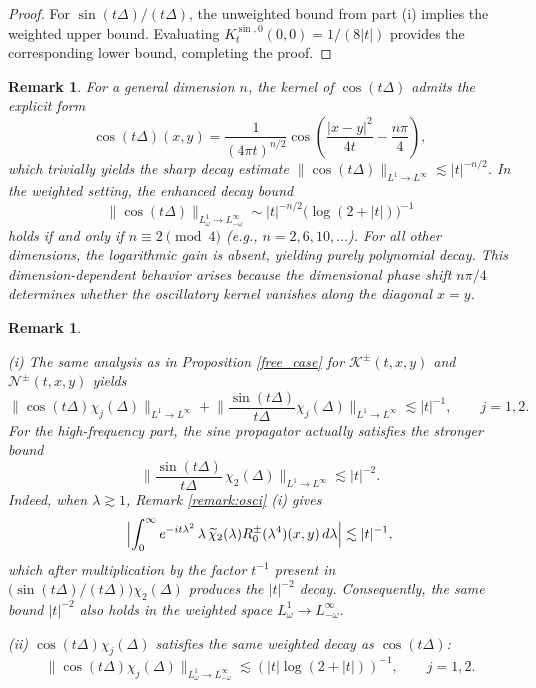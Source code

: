 \documentclass[reqno]{amsart}
\newtheorem{remark}[theorem]{Remark}
\numberwithin{equation}{section}
\begin{document}
\begin{proof}
	For $\sin(t\Delta)/(t\Delta)$, the unweighted  bound from part (i) implies the weighted upper bound. Evaluating $K_t^{\sin,0}(0, 0) = 1/(8|t|)$ provides the corresponding lower bound, completing the proof.
\end{proof}

\begin{remark}\label{free_cos_higher_dim}{\rm 
For a general dimension $n$, the kernel of $\cos(t\Delta)$ admits the explicit form
\[
\cos(t\Delta)(x,y) = \frac{1}{(4\pi t)^{n/2}} \cos\!\left(\frac{|x-y|^2}{4t} - \frac{n\pi}{4}\right),
\]
which trivially yields the sharp decay estimate $\|\cos(t\Delta)\|_{L^1\to L^\infty} \lesssim |t|^{-n/2}$. 
In the weighted setting, the enhanced decay bound
\[
\|\cos(t\Delta)\|_{L^1_\omega \to L^\infty_{-\omega}} \sim |t|^{-n/2} \bigl(\log(2+|t|)\bigr)^{-1}
\]
holds if and only if $n \equiv 2 \pmod{4}$ (e.g., $n = 2, 6, 10, \dots$). For all other dimensions, the logarithmic gain is absent, yielding purely polynomial decay. This dimension-dependent behavior arises because the dimensional phase shift $n\pi/4$ determines whether the oscillatory kernel  vanishes along the diagonal $x=y$.
}\end{remark}
\begin{remark}\label{rmk:free_case}{\rm
(i) The same analysis as in Proposition \ref{free_case} for $\mathcal{K}^{\pm}(t,x,y)$ and $\mathcal{N}^{\pm}(t,x,y)$ yields
\[
\big\|\cos(t\Delta)\chi_j(\Delta)\big\|_{L^1\to L^{\infty}}
+ \Big\|\frac{\sin(t\Delta)}{t\Delta}\chi_j(\Delta)\Big\|_{L^1\to L^{\infty}} \lesssim |t|^{-1},
\qquad j=1,2.
\]
For the high-frequency part, the sine propagator actually satisfies
the stronger bound
\[
\Big\|\frac{\sin(t\Delta)}{t\Delta}\,\chi_2(\Delta)\Big\|_{L^1\to L^{\infty}} \lesssim |t|^{-2}.
\]
Indeed, when $\lambda\gtrsim1$, Remark \ref{remark:osci} (i) gives
\[
\Bigl|\int_0^{\infty} e^{-it\lambda^2}\,\lambda\,\widetilde{\chi}_2(\lambda)R_0^{\pm}(\lambda^4)(x,y)\,d\lambda\Bigr| \lesssim |t|^{-1},
\]
which after multiplication by the factor $t^{-1}$ present in $\bigl(\sin(t\Delta)/(t\Delta)\bigr)\chi_2(\Delta)$ produces the $|t|^{-2}$ decay. Consequently,
the same bound $|t|^{-2}$ also holds in the weighted space $L^1_\omega \rightarrow L^{\infty}_{-\omega}$.
\vskip0.2cm

(ii)
$\cos(t\Delta)\chi_j(\Delta)$ satisfies the same weighted decay as $\cos(t\Delta)$:
\[
\|\cos(t\Delta)\chi_j(\Delta)\|_{L^1_\omega\to L^{\infty}_{-\omega}} \lesssim (|t|\log(2+|t|))^{-1}, \qquad j=1,2.
\]
}
\end{remark}
\end{document}
